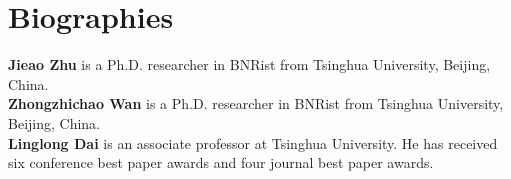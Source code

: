 \documentclass[journal,twocolumn]{IEEEtran}
\begin{document}
\footnotesize




\normalsize
\section*{Biographies}

{\bf Jieao Zhu} is a Ph.D. researcher in BNRist from Tsinghua University, Beijing, China.
\\

{\bf Zhongzhichao Wan} is a Ph.D. researcher in BNRist from Tsinghua University, Beijing, China.
\\


{\bf Linglong Dai} is an associate professor at Tsinghua University. He has received six conference best paper awards and four journal best paper awards. 
\end{document}
